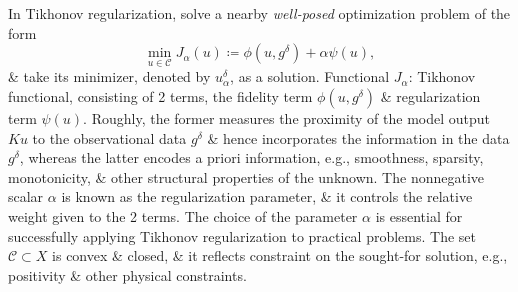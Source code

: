 \documentclass{article}
\begin{document}
\begin{enumerate}
\begin{itemize}
		In Tikhonov regularization, solve a nearby {\it well-posed} optimization problem of the form
		\begin{equation}
			\min_{u\in\mathcal{C}} J_\alpha(u)\coloneqq\phi(u,g^\delta) + \alpha\psi(u),
		\end{equation}
		\& take its minimizer, denoted by $u_\alpha^\delta$, as a solution. Functional $J_\alpha$: Tikhonov functional, consisting of 2 terms, the fidelity term $\phi(u,g^\delta)$ \& regularization term $\psi(u)$. Roughly, the former measures the proximity of the model output $Ku$ to the observational data $g^\delta$ \& hence incorporates the information in the data $g^\delta$, whereas the latter encodes a priori information, e.g., smoothness, sparsity, monotonicity, \& other structural properties of the unknown. The nonnegative scalar $\alpha$ is known as the regularization parameter, \& it controls the relative weight given to the 2 terms. The choice of the parameter $\alpha$ is essential for successfully applying Tikhonov regularization to practical problems. The set $\mathcal{C}\subset X$ is convex \& closed, \& it reflects constraint on the sought-for solution, e.g., positivity \& other physical constraints.
		

\end{itemize}
\end{enumerate}
\end{document}
